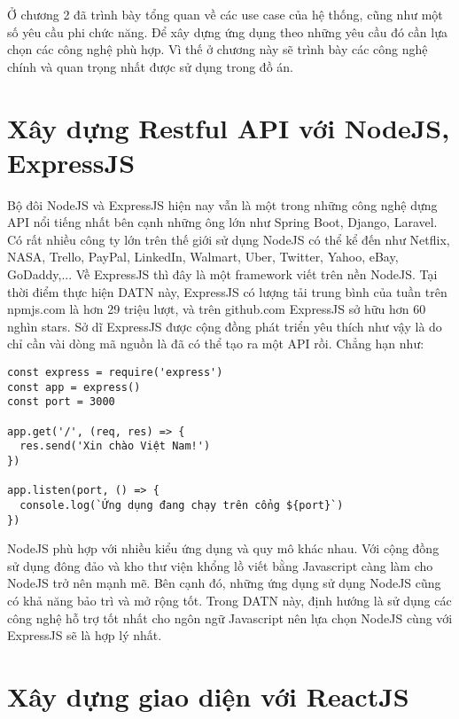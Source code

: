 \documentclass[../DoAn.tex]{subfiles}
\begin{document}
Ở chương 2 đã trình bày tổng quan về các use case của hệ thống, cũng như một số yêu cầu phi chức năng. Để xây dựng ứng dụng theo những yêu cầu đó cần lựa chọn các công nghệ phù hợp. Vì thế ở chương này sẽ trình bày các công nghệ chính và quan trọng nhất được sử dụng trong đồ án.
\section{Xây dựng Restful API với NodeJS, ExpressJS\cite{ExpressJS}}

Bộ đôi NodeJS và ExpressJS hiện nay vẫn là một trong những công nghệ dựng API nổi tiếng nhất bên cạnh những ông lớn như Spring Boot, Django, Laravel. Có rất nhiều công ty lớn trên thế giới sử dụng NodeJS có thể kể đến như Netflix, NASA, Trello, PayPal, LinkedIn, Walmart, Uber, Twitter, Yahoo, eBay, GoDaddy,... Về ExpressJS thì đây là một framework viết trên nền NodeJS.  Tại thời điểm thực hiện DATN này, ExpressJS có lượng tải trung bình của tuần trên npmjs.com là hơn 29 triệu lượt, và trên github.com ExpressJS sở hữu hơn 60 nghìn stars. Sở dĩ ExpressJS được cộng đồng phát triển yêu thích như vậy là do chỉ cần vài dòng mã nguồn là đã có thể tạo ra một API rồi. Chẳng hạn như:
\begin{verbatim}
const express = require('express')
const app = express()
const port = 3000

app.get('/', (req, res) => {
  res.send('Xin chào Việt Nam!')
})

app.listen(port, () => {
  console.log(`Ứng dụng đang chạy trên cổng ${port}`)
})
\end{verbatim}
NodeJS phù hợp với nhiều kiểu ứng dụng và quy mô khác nhau. Với cộng đồng sử dụng đông đảo và kho thư viện khổng lồ viết bằng Javascript càng làm cho NodeJS trở nên mạnh mẽ. Bên cạnh đó, những ứng dụng sử dụng NodeJS cũng có khả năng bảo trì và mở rộng tốt. Trong DATN này, định hướng là sử dụng các công nghệ hỗ trợ tốt nhất cho ngôn ngữ Javascript nên lựa chọn NodeJS cùng với ExpressJS sẽ là hợp lý nhất.

\section{Xây dựng giao diện với ReactJS\cite{ReactJS}}
\end{document}
